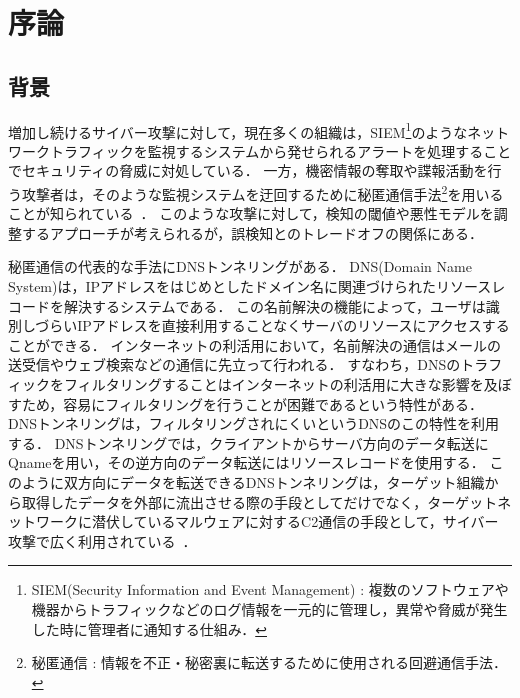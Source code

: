 \section{序論}
\subsection{背景}
増加し続けるサイバー攻撃に対して，現在多くの組織は，SIEM\footnote{SIEM(Security Information and Event Management) : 複数のソフトウェアや機器からトラフィックなどのログ情報を一元的に管理し，異常や脅威が発生した時に管理者に通知する仕組み．}のようなネットワークトラフィックを監視するシステムから発せられるアラートを処理することでセキュリティの脅威に対処している．
一方，機密情報の奪取や諜報活動を行う攻撃者は，そのような監視システムを迂回するために秘匿通信手法\footnote{秘匿通信 : 情報を不正・秘密裏に転送するために使用される回避通信手法．}を用いることが知られている~\cite{mitre-custom-c2}．
このような攻撃に対して，検知の閾値や悪性モデルを調整するアプローチが考えられるが，誤検知とのトレードオフの関係にある．

秘匿通信の代表的な手法にDNSトンネリングがある．
DNS(Domain Name System)は，IPアドレスをはじめとしたドメイン名に関連づけられたリソースレコードを解決するシステムである．
この名前解決の機能によって，ユーザは識別しづらいIPアドレスを直接利用することなくサーバのリソースにアクセスすることができる．
インターネットの利活用において，名前解決の通信はメールの送受信やウェブ検索などの通信に先立って行われる．
すなわち，DNSのトラフィックをフィルタリングすることはインターネットの利活用に大きな影響を及ぼすため，容易にフィルタリングを行うことが困難であるという特性がある．
DNSトンネリングは，フィルタリングされにくいというDNSのこの特性を利用する．
DNSトンネリングでは，クライアントからサーバ方向のデータ転送にQnameを用い，その逆方向のデータ転送にはリソースレコードを使用する．
このように双方向にデータを転送できるDNSトンネリングは，ターゲット組織から取得したデータを外部に流出させる際の手段としてだけでなく，ターゲットネットワークに潜伏しているマルウェアに対するC2通信の手段として，サイバー攻撃で広く利用されている~\cite{frameworkpos, bondupdater, bernhardpos, multigrainpos, pisloader, denis, dnsmessenger, udpos}．

